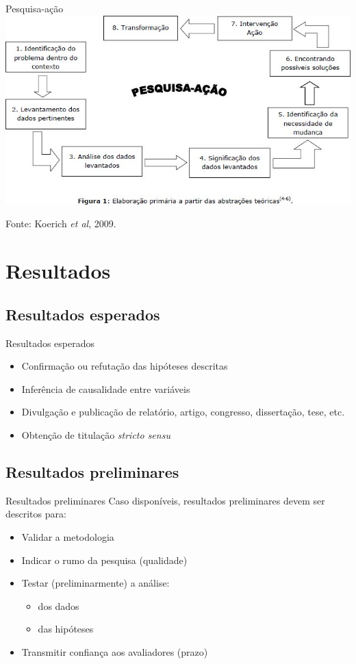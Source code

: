 \documentclass{beamer}
\begin{document}
\begin{frame}{Pesquisa-ação}
  \includegraphics[width=\textwidth]{ProjetoII/pesquisa-acao}

  Fonte: Koerich {\em et al}, 2009.
\end{frame}

\section{Resultados}

\subsection{Resultados esperados}

\begin{frame}{Resultados esperados}
  \begin{itemize}
  \item Confirmação ou refutação das hipóteses descritas
  \item Inferência de causalidade entre variáveis
  \item Divulgação e publicação de relatório, artigo, congresso,
    dissertação, tese, etc.
  \item Obtenção de titulação {\em stricto sensu}
  \end{itemize}
\end{frame}

\subsection{Resultados preliminares}

\begin{frame}{Resultados preliminares}
  Caso disponíveis, resultados preliminares devem ser descritos para:
  \begin{itemize}
  \item Validar a metodologia
  \item Indicar o rumo da pesquisa (qualidade)
  \item Testar (preliminarmente) a análise:
    \begin{itemize}
    \item dos dados
    \item das hipóteses
    \end{itemize}
  \item Transmitir confiança aos avaliadores (prazo)
  \end{itemize}
\end{frame}
\end{document}
